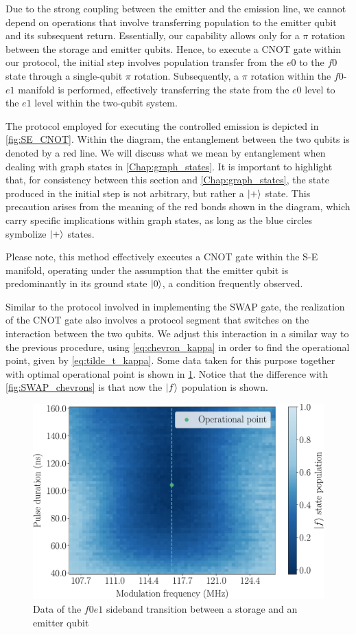 Due to the strong coupling between the emitter and the emission line, we cannot depend on operations that involve transferring population to the emitter qubit and its subsequent return.
Essentially, our capability allows only for a $\pi$ rotation between the storage and emitter qubits.
Hence, to execute a CNOT gate within our protocol, the initial step involves population transfer from the $e0$ to the $f0$ state through a single-qubit $\pi$ rotation. 
Subsequently, a $\pi$ rotation within the $f0$-$e1$ manifold is performed, effectively transferring the state from the $e0$ level to the $e1$ level within the two-qubit system.

The protocol employed for executing the controlled emission is depicted in \cref{fig:SE_CNOT}.
Within the diagram, the entanglement between the two qubits is denoted by a red line. We will discuss what we mean by entanglement when dealing with graph states in \cref{Chap:graph_states}.
It is important to highlight that, for consistency between this section and \cref{Chap:graph_states}, the state produced in the initial step is not arbitrary, but rather a $\ket{+}$ state.
This precaution arises from the meaning of the red bonds shown in the diagram, which carry specific implications within graph states, as long as the blue circles symbolize $\ket{+}$ states.

Please note, this method effectively executes a CNOT gate within the S-E manifold, operating under the assumption that the emitter qubit is predominantly in its ground state $\ket{0}$, a condition frequently observed.

Similar to the protocol involved in implementing the SWAP gate, the realization of the CNOT gate also involves a protocol segment that switches on the interaction between the two qubits. 
We adjust this interaction in a similar way to the previous procedure, using \cref{eq:chevron_kappa}  in order to find the operational point, given by \cref{eq:tilde_t_kappa}.
Some data taken for this purpose together with optimal operational point is shown in \cref{fig:CNOT_data}.
Notice that the difference with \cref{fig:SWAP_chevrons} is that now the $\ket{f}$ population is shown.

\begin{figure}
    \centering
    \includegraphics[width = 0.8 \textwidth]{Images/Chap3/CNOT_data.pdf}
    \caption{Data of the $f0e1$ sideband transition between a storage and an emitter qubit}
    \label{fig:CNOT_data}
\end{figure}
